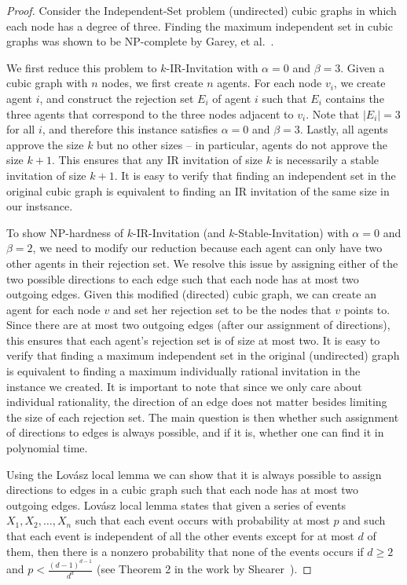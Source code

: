 \begin{proof}
Consider the Independent-Set problem (undirected) cubic graphs in which each node has a degree of three. Finding the maximum independent set in cubic graphs was shown to be NP-complete by Garey, et al.~\cite{Garey_Max_Is_Cubic}. 

We first reduce this problem to $k$-IR-Invitation with $\alpha = 0$ and $\beta = 3$. Given a cubic graph with $n$ nodes, we first create $n$ agents. For each node $v_i$, we create agent $i$, and construct the rejection set $E_i$ of agent $i$ such that $E_i$ contains the three agents that correspond to the three nodes adjacent to $v_i$.  Note that $|E_i| = 3$ for all $i$, and therefore this instance satisfies $\alpha = 0$ and $\beta = 3$. Lastly, all agents approve the size $k$ but no other sizes -- in particular, agents do not approve the size $k+1$. This ensures that any IR invitation of size $k$ is necessarily a stable invitation of size $k+1$. It is easy to verify that finding an independent set in the original cubic graph is equivalent to finding an IR invitation of the same size in our instsance. 
	
To show NP-hardness of $k$-IR-Invitation (and $k$-Stable-Invitation) with $\alpha = 0$ and $\beta = 2$, we need to modify our reduction because each agent can only have two other agents in their rejection set.  We resolve this issue by assigning either of the two possible directions to each edge such that each node has at most two outgoing edges. Given this modified (directed) cubic graph, we can create an agent for each node $v$ and set her rejection set to be the nodes that $v$ points to. Since there are at most two outgoing edges (after our assignment of directions), this ensures that each agent's rejection set is of size at most two. It is easy to verify that finding a maximum independent set in the original (undirected) graph is equivalent to finding a maximum individually rational invitation in the instance we created. It is important to note that since we only care about individual rationality, the direction of an edge does not matter besides limiting the size of each rejection set.  The main question is then whether such assignment of directions to edges is always possible, and if it is, whether one can find it in polynomial time. 

Using the Lov{\'a}sz local lemma we can show that it is always possible to assign directions to edges in a cubic graph such that each node has at most two outgoing edges. Lov{\'a}sz local lemma states that given a series of events $X_1, X_2, \dots, X_n$ such that each event occurs with probability at most $p$ and such that each event is independent of all the other events except for at most $d$ of them, then there is a nonzero probability that none of the events occurs if $d \geq 2$ and $p < \frac{(d-1)^{d-1}}{d^d}$ (see Theorem 2 in the work by Shearer~\cite{lovasz_local_lemma}).


\end{proof}
